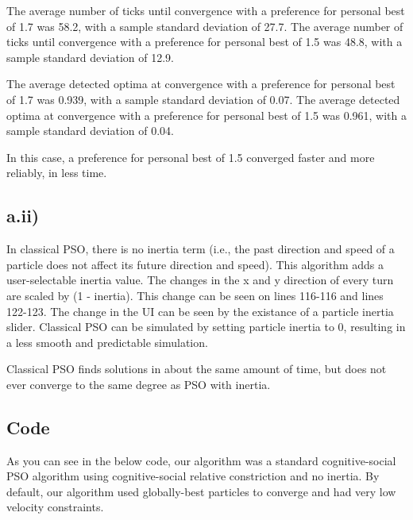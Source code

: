 \documentclass[12pt]{article}
\begin{document}
The average number of ticks until convergence with a preference for personal best of 1.7 was 58.2, with a sample standard deviation of 27.7.
The average number of ticks until convergence with a preference for personal best of 1.5 was 48.8, with a sample standard deviation of 12.9.

The average detected optima at convergence with a preference for personal best of 1.7 was 0.939, with a sample standard deviation of 0.07.
The average detected optima at convergence with a preference for personal best of 1.5 was 0.961, with a sample standard deviation of 0.04.

In this case, a preference for personal best of 1.5 converged faster and more reliably, in less time.

\subsection*{a.ii)}

In classical PSO, there is no inertia term (i.e., the past direction and speed of a particle does not affect its future direction and speed). This algorithm adds a user-selectable inertia value. The changes in the x and y direction of every turn are scaled by (1 - inertia). This change can be seen on lines 116-116 and lines 122-123. The change in the UI can be seen by the existance of a particle inertia slider. Classical PSO can be simulated by setting particle inertia to 0, resulting in a less smooth and predictable simulation.

Classical PSO finds solutions in about the same amount of time, but does not ever converge to the same degree as PSO with inertia.

\subsection*{Code}
As you can see in the below code, our algorithm was a standard cognitive-social PSO algorithm using cognitive-social relative constriction and no inertia. By default, our algorithm used globally-best particles to converge and had very low velocity constraints.


\end{document}

